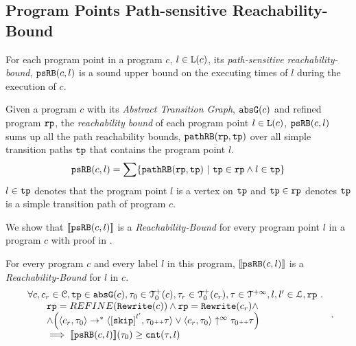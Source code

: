 \subsection{Program Points Path-sensitive Reachability-Bound}
\label{sec:point-psrb}
For each program point in a program $c$, $l \in \mathtt{L}(c)$,
its \emph{path-sensitive reachability-bound}, $\mathtt{psRB}(c, l)$ is a sound upper bound on the executing times of $l$ during the execution of $c$.
%
 \begin{defn}
  \label{def:point_psrb}
  Given a program $c$ with its \emph{Abstract Transition Graph}, $\mathtt{abs}{\mathtt{G}}(c)$ and refined program $\mathtt{rp}$,
  the \emph{reachability bound} of each program point $l \in \mathtt{L}(c)$, $\mathtt{psRB}(c, l)$ 
  sums up all the path reachability bounds, $\mathtt{pathRB}(\mathtt{rp}, \mathtt{tp})$ over all simple transition paths $\mathtt{tp}$ that contains the program point $l$.
  \[ 
    \psRB(c, l) = 
    \sum
    \left\{ \inoutB(\rprog, \tpath) ~\vert~ \tpath \in \rprog \land 
    l \in \tpath \right\}
  \]
  $l \in \mathtt{tp}$ denotes that the program point $l$ is a vertex on $\mathtt{tp}$ 
  and $\mathtt{tp} \in \mathtt{rp}$ denotes $\mathtt{tp}$ is a simple transition path of program $c$.
 \end{defn}
We show that $\llbracket \mathtt{psRB}(c, l) \rrbracket$ is a \emph{Reachability-Bound} for every program point $l$ in a program $c$ with proof in .
\begin{thm}
    \label{thm:pathsensitive_rb_soundness}
  For every program ${c}$ and every label $l$ in this program,
  $\llbracket \mathtt{psRB}(c, l) \rrbracket$ is a \emph{Reachability-Bound} for $l$ in $c$.
  \[
    \begin{array}{l}
      \forall c, c_r \in \cdom, \tpath \in \absG(c), \trace_0 \in \ftdom_0(c),  \trace_r \in \ftdom_0(c_r), \trace \in \tdom, l, l' \in \ldom, \rprog \st 
      \\ \qquad
      \rprog = REFINE(\algrewrite(c))
      \land 
      \rprog = \algrewrite(c_r)
      \land
      \\ \qquad
      \land
      \Big(
      \config{c_r, \trace_0} \rightarrow^* \config{\clabel{\eskip}^{l'}, \trace_0 \tracecat \trace}
      \lor \config{c_r, \trace_0} \uparrow^{\infty} \trace_0 \tracecat \trace 
      \Big)
      \\ \qquad
      \implies \econfig{\psRB(c, l)}(\trace_0) \geq \counter(\trace, l)
    \end{array}.
  \]
  \end{thm}
